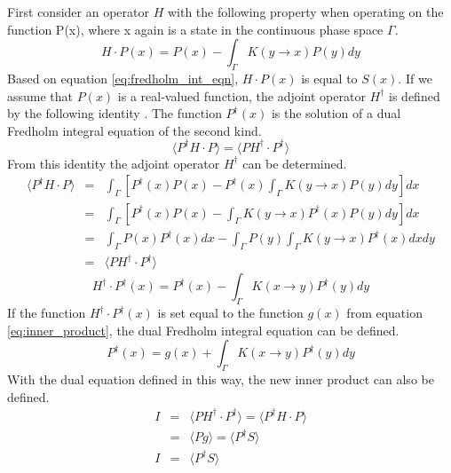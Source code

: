 First consider an operator $H$ with the following property when operating
on the function P(x), where x again is a state in the continuous phase space
$\Gamma$. 
\begin{equation}
  H \cdot P(x) = P(x) - \int_{\Gamma} K(y \to x)P(y)dy
  \label{eq:forward_operator}
\end{equation}
Based on equation \ref{eq:fredholm_int_eqn}, $H \cdot P(x)$ is equal to $S(x)$.
If we assume that $P(x)$ is a real-valued function, the adjoint operator 
$H^{\dagger}$ is defined by the following identity 
\citep{lewis_computational_1993}. The function $P^{\dagger}(x)$ is the solution 
of a dual Fredholm integral equation of the second kind. 
\begin{equation}
  \langle P^{\dagger}H \cdot P \rangle = 
  \langle PH^{\dagger} \cdot P^{\dagger} \rangle
  \label{eq:forward_adjoint_ops}
\end{equation}
From this identity the adjoint operator $H^{\dagger}$ can be determined.
\begin{eqnarray}
  \langle P^{\dagger}H \cdot P \rangle & = & \int_{\Gamma} \left[P^{\dagger}(x)P(x) -
  P^{\dagger}(x)\int_{\Gamma}K(y \to x)P(y)dy \right]dx \nonumber \\
  & = & \int_{\Gamma} \left[P^{\dagger}(x)P(x) -
  \int_{\Gamma}K(y \to x)P^{\dagger}(x)P(y)dy \right]dx \nonumber \\
  & = & \int_{\Gamma} P(x)P^{\dagger}(x)dx - 
  \int_{\Gamma}P(y)\int_{\Gamma}K(y \to x)P^{\dagger}(x)dxdy \nonumber \\
  & = & \langle PH^{\dagger} \cdot P^{\dagger} \rangle \nonumber
\end{eqnarray}
\begin{equation}
  H^{\dagger} \cdot P^{\dagger}(x) = P^{\dagger}(x) - 
  \int_{\Gamma}K(x \to y)P^{\dagger}(y)dy
  \label{eq:adjoint_operator}
\end{equation}
If the function $H^{\dagger} \cdot P^{\dagger}(x)$ is set equal to the function
$g(x)$ from equation \ref{eq:inner_product}, the dual Fredholm integral
equation can be defined.
\begin{equation}
  P^{\dagger}(x) = g(x) + \int_{\Gamma}K(x \to y)P^{\dagger}(y)dy
  \label{eq:dual_fredholm_int_eqn}
\end{equation}
With the dual equation defined in this way, the new inner product can also
be defined.
\begin{eqnarray}
  I & = & \langle PH^{\dagger} \cdot P^{\dagger} \rangle = 
  \langle P^{\dagger}H \cdot P \rangle \nonumber \\
  & = & \langle Pg \rangle \nonumber = \langle P^{\dagger}S \rangle \nonumber \\
  I & = & \langle P^{\dagger}S \rangle
\end{eqnarray}
